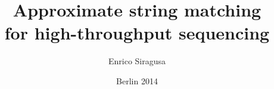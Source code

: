 \documentclass[nocenter,twoside,a4paper,12pt,crosshair,upper,bold,final]{thesis}
\newcommand{\clearemptydoublepage}{\newpage{\pagestyle{empty}\cleardoublepage}}
\begin{document}
 


\frontmatter


\title{Approximate string matching \\for high-throughput sequencing} %

\author{Enrico Siragusa}






\lowertitleback{
Datum des Disputation: \emph{\textbf{XX.XX.2015}}\\[1ex]
Gutachter:\\
\emph{\textbf{Prof. Dr. Knut Reinert}, Freie Universit"at Berlin, Deutschland}\\
\emph{\textbf{Prof. Dr. Raffaele Giancarlo}, Universit\`a degli Studi di Palermo, Italien}\\
}
\date{Berlin 2014}

\maketitle
\clearemptydoublepage

\setcounter{page}{5}





\clearemptydoublepage
\end{document}
